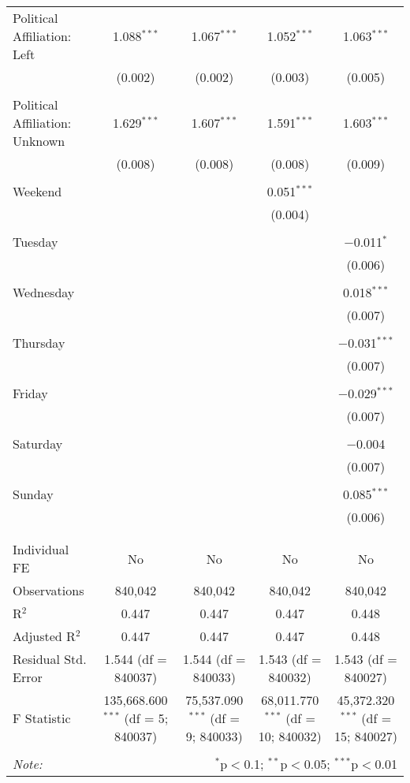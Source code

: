 \documentclass[
]{article}
\begin{document}
\begin{table}[!htbp]
{\begin{tabular}{@{\extracolsep{5pt}}lcccc}
 Political Affiliation: Left & 1.088$^{***}$ & 1.067$^{***}$ & 1.052$^{***}$ & 1.063$^{***}$ \\ 
  & (0.002) & (0.002) & (0.003) & (0.005) \\ 
  & & & & \\ 
 Political Affiliation: Unknown & 1.629$^{***}$ & 1.607$^{***}$ & 1.591$^{***}$ & 1.603$^{***}$ \\ 
  & (0.008) & (0.008) & (0.008) & (0.009) \\ 
  & & & & \\ 
 Weekend &  &  & 0.051$^{***}$ &  \\ 
  &  &  & (0.004) &  \\ 
  & & & & \\ 
 Tuesday &  &  &  & $-$0.011$^{*}$ \\ 
  &  &  &  & (0.006) \\ 
  & & & & \\ 
 Wednesday &  &  &  & 0.018$^{***}$ \\ 
  &  &  &  & (0.007) \\ 
  & & & & \\ 
 Thursday &  &  &  & $-$0.031$^{***}$ \\ 
  &  &  &  & (0.007) \\ 
  & & & & \\ 
 Friday &  &  &  & $-$0.029$^{***}$ \\ 
  &  &  &  & (0.007) \\ 
  & & & & \\ 
 Saturday &  &  &  & $-$0.004 \\ 
  &  &  &  & (0.007) \\ 
  & & & & \\ 
 Sunday &  &  &  & 0.085$^{***}$ \\ 
  &  &  &  & (0.006) \\ 
  & & & & \\ 
\hline \\[-1.8ex] 
Individual FE & No & No & No & No \\ 
Observations & 840,042 & 840,042 & 840,042 & 840,042 \\ 
R$^{2}$ & 0.447 & 0.447 & 0.447 & 0.448 \\ 
Adjusted R$^{2}$ & 0.447 & 0.447 & 0.447 & 0.448 \\ 
Residual Std. Error & 1.544 (df = 840037) & 1.544 (df = 840033) & 1.543 (df = 840032) & 1.543 (df = 840027) \\ 
F Statistic & 135,668.600$^{***}$ (df = 5; 840037) & 75,537.090$^{***}$ (df = 9; 840033) & 68,011.770$^{***}$ (df = 10; 840032) & 45,372.320$^{***}$ (df = 15; 840027) \\ 
\hline 
\hline \\[-1.8ex] 
\textit{Note:}  & \multicolumn{4}{r}{$^{*}$p$<$0.1; $^{**}$p$<$0.05; $^{***}$p$<$0.01} \\ 
\end{tabular}
} 
\end{table} 
\newpage
\end{document}
